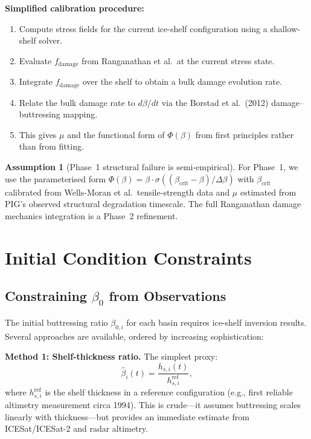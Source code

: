 \documentclass[11pt]{article}
\theoremstyle{definition}
\newtheorem{assumption}{Assumption}
\begin{document}
\textbf{Simplified calibration procedure:}
\begin{enumerate}
  \item Compute stress fields for the current ice-shelf configuration using a shallow-shelf solver.
  \item Evaluate $f_{\text{damage}}$ from Ranganathan et al.\ at the current stress state.
  \item Integrate $f_{\text{damage}}$ over the shelf to obtain a bulk damage evolution rate.
  \item Relate the bulk damage rate to $d\beta/dt$ via the Borstad et al.\ (2012) damage--buttressing mapping.
  \item This gives $\mu$ and the functional form of $\Phi(\beta)$ from first principles rather than from fitting.
\end{enumerate}

\begin{assumption}[Phase~1 structural failure is semi-empirical]
  \label{assump:damage_phase1}
  For Phase~1, we use the parameterised form $\Phi(\beta) = \beta \cdot \sigma((\beta_{\text{crit}} - \beta)/\Delta\beta)$ with $\beta_{\text{crit}}$ calibrated from Wells-Moran et al.\ tensile-strength data and $\mu$ estimated from PIG's observed structural degradation timescale.  The full Ranganathan damage mechanics integration is a Phase~2 refinement.
\end{assumption}


\section{Initial Condition Constraints}
\label{sec:initial_conditions}

\subsection{Constraining $\beta_0$ from Observations}

The initial buttressing ratio $\beta_{0,i}$ for each basin requires ice-shelf inversion results.  Several approaches are available, ordered by increasing sophistication:

\textbf{Method 1: Shelf-thickness ratio.}  The simplest proxy:
\begin{equation}
  \hat{\beta}_i(t) = \frac{h_{s,i}(t)}{h_{s,i}^{\text{ref}}},
\end{equation}
where $h_{s,i}^{\text{ref}}$ is the shelf thickness in a reference configuration (e.g., first reliable altimetry measurement circa 1994).  This is crude---it assumes buttressing scales linearly with thickness---but provides an immediate estimate from ICESat/ICESat-2 and radar altimetry.
\end{document}
